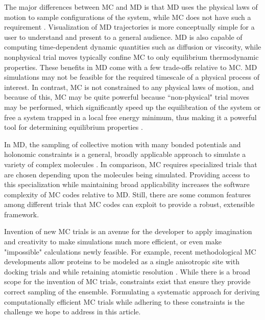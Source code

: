 The major differences between MC and MD is that MD uses the physical laws of motion to sample configurations of the system, while MC does not have such a requirement \cite{allen_computer_1989, frenkel_understanding_2002}.
Visualization of MD trajectories is more conceptually simple for a user to understand and present to a general audience.
MD is also capable of computing time-dependent dynamic quantities such as diffusion or viscosity, while nonphysical trial moves typically confine MC to only equilibrium thermodynamic properties.
These benefits in MD come with a few trade-offs relative to MC.
MD simulations may not be feasible for the required timescale of a physical process of interest.
In contrast, MC is not constrained to any physical laws of motion, and because of this, MC may be quite powerful because ``non-physical" trial moves may be performed, which significantly speed up the equilibration of the system or free a system trapped in a local free energy minimum, thus making it a powerful tool for determining equilibrium properties \cite{frenkel_understanding_2002, barhaghi_py-mcmd_2022, henin_enhanced_2022}.

In MD, the sampling of collective motion with many bonded potentials and holonomic constraints is a general, broadly applicable approach to simulate a variety of complex molecules \cite{ryckaert_numerical_1977, andersen_rattle_1983}.
In comparison, MC requires specialized trials that are chosen depending upon the molecules being simulated.
Providing access to this specialization while maintaining broad applicability increases the software complexity of MC codes relative to MD.
Still, there are some common features among different trials that MC codes can exploit to provide a robust, extensible framework.

Invention of new MC trials is an avenue for the developer to apply imagination and creativity to make simulations much more efficient, or even make "impossible" calculations newly feasible.
For example, recent methodological MC developments allow proteins to be modeled as a single anisotropic site with docking trials \cite{vakser_docking-based_2022} and while retaining atomistic resolution \cite{hatch_anisotropic_2024}.
While there is a broad scope for the invention of MC trials, constraints exist that ensure they provide correct sampling of the ensemble.
Formulating a systematic approach for deriving computationally efficient MC trials while adhering to these constraints is the challenge we hope to address in this article.

